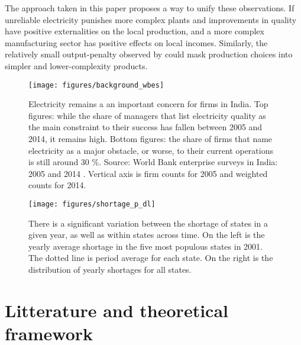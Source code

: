 \documentclass[11pt]{article}
\begin{document}
The approach taken in this paper proposes a way to unify these observations. If unreliable electricity punishes more complex plants and improvements in quality have positive externalities on the local production, and a more complex manufacturing sector has positive effects on local incomes. Similarly, the relatively small output-penalty observed by \cite{allcott_how_2016} could mask production choices into simpler and lower-complexity products.


\begin{figure}[htpb]
	\centering
	\texttt{[image: figures/background\_wbes]}
	\caption[Enterprise survey: obstacles for firms]{Electricity remains a an important concern for firms in India. Top figures: while the share of managers that list electricity quality as the main constraint to their success has fallen between 2005 and 2014, it remains high. Bottom figures: the share of firms that name electricity as a major obstacle, or worse, to their current operations is still around 30 \%. Source: World Bank enterprise surveys in India: 2005 and 2014 \citep{world_bank_enterprise_2020-2,world_bank_enterprise_2020-1}. Vertical axis is firm counts for 2005 and weighted counts for 2014.}
	\label{fig:biggest_obstacle}
\end{figure}

\begin{figure}[htpb]
	\centering
	\label{fig:shortage_p_dl}
	\texttt{[image: figures/shortage\_p\_dl]}
	\caption[Variation in electricity shortages in Indian states]{There is a significant variation between the shortage of states in a given year, as well as within states across time. On the left is the yearly average shortage in the five most populous states in 2001. The dotted line is period average for each state. On the right is the distribution of yearly shortages for all states.}%
	\label{fig:shortage_dist}
\end{figure}


\newpage

\section{Litterature and theoretical framework}%
\label{sec:framework}

\end{document}
